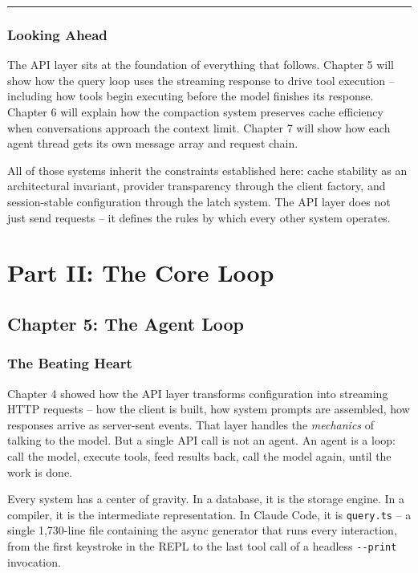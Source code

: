 \documentclass[
  english,
  11pt,
  letterpaper,
]{book}
\begin{document}
\begin{center}\rule{0.5\linewidth}{0.5pt}\end{center}

\section{Looking Ahead}\label{looking-ahead}

The API layer sits at the foundation of everything that follows. Chapter
5 will show how the query loop uses the streaming response to drive tool
execution -- including how tools begin executing before the model
finishes its response. Chapter 6 will explain how the compaction system
preserves cache efficiency when conversations approach the context
limit. Chapter 7 will show how each agent thread gets its own message
array and request chain.

All of those systems inherit the constraints established here: cache
stability as an architectural invariant, provider transparency through
the client factory, and session-stable configuration through the latch
system. The API layer does not just send requests -- it defines the
rules by which every other system operates.

\part{Part II: The Core Loop}

\chapter{Chapter 5: The Agent Loop}\label{chapter-5-the-agent-loop}

\section{The Beating Heart}\label{the-beating-heart}

Chapter 4 showed how the API layer transforms configuration into
streaming HTTP requests -- how the client is built, how system prompts
are assembled, how responses arrive as server-sent events. That layer
handles the \emph{mechanics} of talking to the model. But a single API
call is not an agent. An agent is a loop: call the model, execute tools,
feed results back, call the model again, until the work is done.

Every system has a center of gravity. In a database, it is the storage
engine. In a compiler, it is the intermediate representation. In Claude
Code, it is \texttt{query.ts} -- a single 1,730-line file containing the
async generator that runs every interaction, from the first keystroke in
the REPL to the last tool call of a headless \texttt{-\/-print}
invocation.
\end{document}
